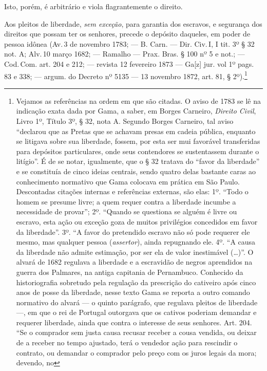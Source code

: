 Isto, porém, é arbitrário e viola flagrantemente o direito.

Aos pleitos de liberdade, \emph{sem exceção}, para garantia dos
escravos, e segurança dos direitos que possam ter os senhores, precede o
depósito daqueles, em poder de pessoa idônea (Av.\,3 de novembro 1783; ---
B. Carn. --- Dir. Civ.\,I, I tit. 3º § 32 not. A; Alv.\,10 março 1682; ---
Ramalho --- Prax. Bras. § 100 nº 5 e not.; --- Cod.\,Com. art. 204 e 212; ---
revista 12 fevereiro 1873 --- Ga{[}z{]} jur. vol 1º pags. 83 e 338; ---
argum. do Decreto nº 5135 --- 13 novembro 1872, art. 81, § 2º).\footnote{
  Vejamos as referências na ordem em que são citadas. O aviso de 1783 se
  lê na indicação exata dada por Gama, a saber, em Borges Carneiro,
  \emph{Direito Civil}, Livro 1º, Título 3º, § 32, nota A. Segundo
  Borges Carneiro, tal aviso ``declarou que as Pretas que se achavam
  presas em cadeia pública, enquanto se litigava sobre sua liberdade,
  fossem, por esta ser mui favorável transferidas para depósitos
  particulares, onde seus contendores se sustentassem durante o
  litígio''. É de se notar, igualmente, que o § 32 tratava do ``favor da
  liberdade'' e se constituía de cinco ideias centrais, sendo quatro
  delas bastante caras ao conhecimento normativo que Gama colocava em
  prática em São Paulo. Descontadas citações internas e referências
  externas, são elas: 1º. ``Todo o homem se presume livre; a quem requer
  contra a liberdade incumbe a necessidade de provar''; 2º.
  ``Quando se questiona se alguém é livre ou escravo, esta ação ou
  exceção goza de muitos privilégios concedidos em favor da liberdade''.
  3º. ``A favor do pretendido escravo não só pode requerer ele mesmo, mas
  qualquer pessoa (\emph{assertor}), ainda repugnando ele. 4º. ``A causa
  da liberdade não admite estimação, por ser ela de valor inestimável
  (\ldots{})''. O alvará de 1682 regulava a liberdade e a escravidão de negros
  aprendidos na guerra dos Palmares, na antiga capitania de Pernambuco.
  Conhecido da historiografia sobretudo pela regulação da prescrição do
  cativeiro após cinco anos de posse da liberdade, nesse texto Gama se
  reporta a outro comando normativo do alvará --- o quinto parágrafo, que
  regulava pleitos de liberdade ---, em que o rei de Portugal outorgava que
  os cativos poderiam demandar e requerer liberdade, ainda que contra o
  interesse de seus senhores. Art. 204. ``Se o comprador sem justa causa
  recusar receber a cousa vendida, ou deixar de a receber no tempo
  ajustado, terá o vendedor ação para rescindir o contrato, ou demandar
  o comprador pelo preço com os juros legais da mora; devendo, no
}
